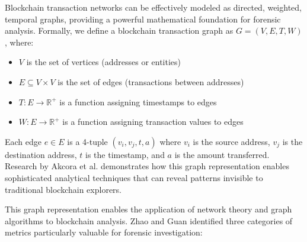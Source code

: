 \documentclass[conference]{IEEEtran}
\begin{document}
Blockchain transaction networks can be effectively modeled as directed, weighted, temporal graphs, providing a powerful mathematical foundation for forensic analysis. Formally, we define a blockchain transaction graph as $G = (V, E, T, W)$, where:

\begin{itemize}
    \item $V$ is the set of vertices (addresses or entities)
    \item $E \subseteq V \times V$ is the set of edges (transactions between addresses)
    \item $T: E \rightarrow \mathbb{R}^+$ is a function assigning timestamps to edges
    \item $W: E \rightarrow \mathbb{R}^+$ is a function assigning transaction values to edges
\end{itemize}

Each edge $e \in E$ is a 4-tuple $(v_i, v_j, t, a)$ where $v_i$ is the source address, $v_j$ is the destination address, $t$ is the timestamp, and $a$ is the amount transferred. Research by Akcora et al. \cite{akcora2020} demonstrates how this graph representation enables sophisticated analytical techniques that can reveal patterns invisible to traditional blockchain explorers.

This graph representation enables the application of network theory and graph algorithms to blockchain analysis. Zhao and Guan \cite{zhao2022} identified three categories of metrics particularly valuable for forensic investigation:
\end{document}
